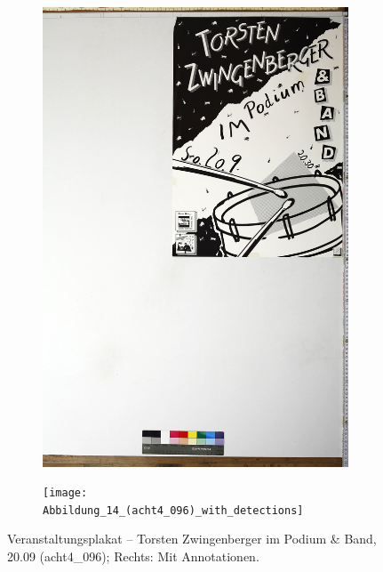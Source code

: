 \documentclass[a4paper,12pt,ngerman]{article}
\begin{document}
\newpage
\begin{landscape}
\begin{figure}[ht]
	\begin{subfigure}[b]{0.5\linewidth}
	\centering
	\includegraphics[height=\linewidth]{Abbildung_18_(acht4_096)}
	\end{subfigure}
	\begin{subfigure}[b]{0.5\linewidth}
	\centering
	\texttt{[image: Abbildung\_14\_(acht4\_096)\_with\_detections]}
	\end{subfigure}
	\caption{Veranstaltungsplakat – Torsten Zwingenberger im Podium \& Band, 20.09 (acht4\_096); Rechts: Mit Annotationen.}
\end{figure}
\end{landscape}
\end{document}
